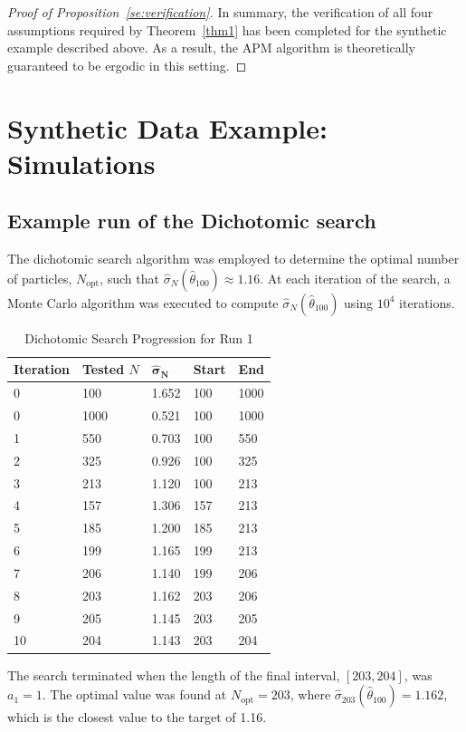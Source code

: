 \documentclass[pdflatex,sn-mathphys-num]{sn-jnl}
\theoremstyle{thmstyleone}
\theoremstyle{thmstyletwo}
\theoremstyle{thmstylethree}
\begin{document}
\begin{proof}[Proof of Proposition~\ref{se:verification}]
In summary, the verification of all four assumptions required by Theorem~\ref{thm1} has been completed for the synthetic example described above. As a result, the APM algorithm is theoretically guaranteed to be ergodic in this setting.
\end{proof}

\section{Synthetic Data Example: Simulations}
\label{appendixD}
\subsection{Example run of the Dichotomic search}
\label{appendixD1}
The dichotomic search algorithm was employed to determine the optimal number of particles, $N_{\text{opt}}$, such that $\hat{\sigma}_N(\hat{\theta}_{100}) \approx 1.16$. At each iteration of the search, a Monte Carlo algorithm was executed to compute $\hat{\sigma}_N(\hat{\theta}_{100})$ using $10^4$ iterations.

\begin{table}[h]
\centering
\caption{Dichotomic Search Progression for Run 1}
\label{tab:dichotomic_run1}
\begin{tabular}{lllll}
\toprule
\textbf{Iteration} & 
\textbf{Tested $N$} & 
$\mathbf{\hat{\sigma}_N}$ & 
\textbf{Start} & 
\textbf{End} \\
\hline
0 & 100 & 1.652 & 100 & 1000 \\
0 & 1000 & 0.521 & 100 & 1000\\
1 & 550 & 0.703 & 100 & 550   \\
2 & 325 & 0.926 & 100 & 325  \\
3 & 213 & 1.120 & 100 & 213 \\
4 & 157 & 1.306 & 157 & 213  \\
5 & 185 & 1.200 & 185 & 213  \\
6 & 199 & 1.165 & 199 & 213 \\
7 & 206 & 1.140 & 199 & 206 \\
8 & 203 & 1.162 & 203 & 206\\
9 & 205  & 1.145 & 203 & 205  \\      
10 & 204 & 1.143 & 203 & 204\\
\bottomrule
\end{tabular}
\end{table}

The search terminated when the length of the final interval, $[203, 204]$, was $a_1 = 1$. The optimal value was found at $N_{\text{opt}} = 203$, where $\hat{\sigma}_{203}(\hat{\theta}_{100}) = 1.162$, which is the closest value to the target of 1.16.
\end{document}
